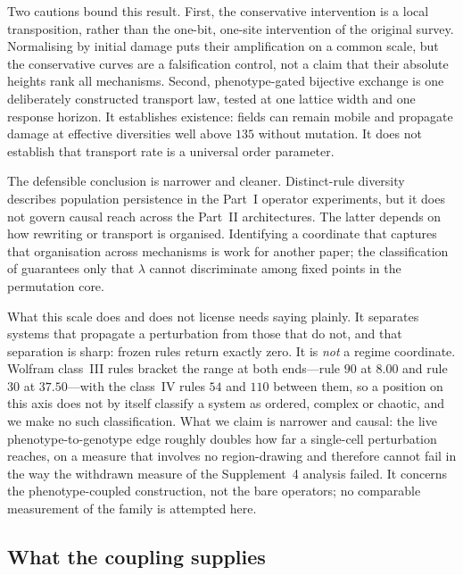 \documentclass[man,12pt,floatsintext,donotrepeattitle]{apa7}
\newcommand{\secref}[1]{\emph{\nameref{#1}}}
\begin{document}
Two cautions bound this result. First, the conservative intervention is a local
transposition, rather than the one-bit, one-site intervention of the original
survey. Normalising by initial damage puts their amplification on a common
scale, but the conservative curves are a falsification control, not a claim
that their absolute heights rank all mechanisms. Second, phenotype-gated
bijective exchange is one deliberately constructed transport law, tested at one
lattice width and one response horizon. It establishes existence: fields can
remain mobile and propagate damage at effective diversities well above $135$
without mutation. It does not establish that transport rate is a universal
order parameter.

The defensible conclusion is narrower and cleaner. Distinct-rule diversity
describes population persistence in the Part~I operator experiments, but it
does not govern causal reach across the Part~II architectures. The latter
depends on how rewriting or transport is organised. Identifying a coordinate
that captures that organisation across mechanisms is work for another paper;
the classification of \secref{sec:classification} guarantees only that
$\lambda$ cannot discriminate among fixed points in the permutation core.

What this scale does and does not license needs saying plainly. It separates
systems that propagate a perturbation from those that do not, and that
separation is sharp: frozen rules return exactly zero. It is \emph{not} a
regime coordinate. Wolfram class~III rules bracket the range at both ends---rule
$90$ at $8.00$ and rule $30$ at $37.50$---with the class~IV rules $54$ and
$110$ between them, so a position on this axis does not by itself classify a
system as ordered, complex or chaotic, and we make no such classification. What
we claim is narrower and causal: the live phenotype-to-genotype edge roughly
doubles how far a single-cell perturbation reaches, on a measure that involves
no region-drawing and therefore cannot fail in the way the withdrawn measure of
the Supplement~4 analysis failed. It concerns the phenotype-coupled construction, not the bare operators;
no comparable measurement of the family is attempted here.

\subsection{What the coupling supplies}
\end{document}
